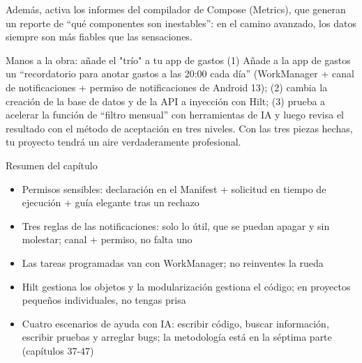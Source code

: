 Además, activa los informes del compilador de Compose (Metrics), que generan un reporte de “qué componentes son inestables”: en el camino avanzado, los datos siempre son más fiables que las sensaciones.

\begin{tcbpractice}{Manos a la obra: añade el "trío" a tu app de gastos}
(1) Añade a la app de gastos un “recordatorio para anotar gastos a las 20:00 cada día” (WorkManager + canal de notificaciones + permiso de notificaciones de Android 13); (2) cambia la creación de la base de datos y de la API a inyección con Hilt; (3) prueba a acelerar la función de “filtro mensual” con herramientas de IA y luego revisa el resultado con el método de aceptación en tres niveles. Con las tres piezas hechas, tu proyecto tendrá un aire verdaderamente profesional.

\end{tcbpractice}

\begin{tcbsummary}{Resumen del capítulo}
\begin{itemize}
  \item Permisos sensibles: declaración en el Manifest + solicitud en tiempo de ejecución + guía elegante tras un rechazo
  \item Tres reglas de las notificaciones: solo lo útil, que se puedan apagar y sin molestar; canal + permiso, no falta uno
  \item Las tareas programadas van con WorkManager; no reinventes la rueda
  \item Hilt gestiona los objetos y la modularización gestiona el código; en proyectos pequeños individuales, no tengas prisa
  \item Cuatro escenarios de ayuda con IA: escribir código, buscar información, escribir pruebas y arreglar bugs; la metodología está en la séptima parte (capítulos 37-47)
\end{itemize}

\end{tcbsummary}
